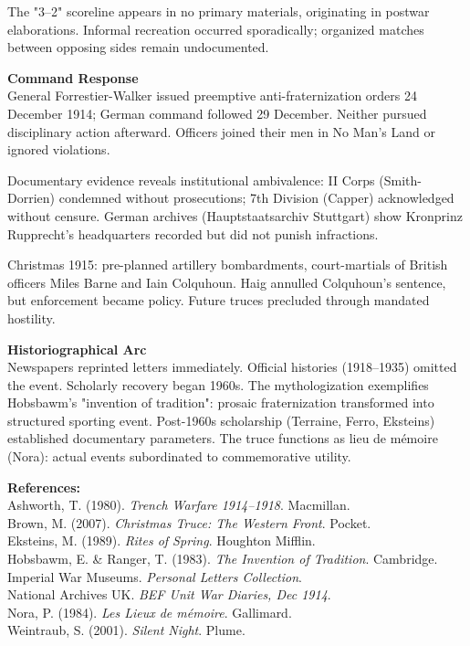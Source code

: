 \begin{technical}
The "3–2" scoreline appears in no primary materials, originating in postwar elaborations. Informal recreation occurred sporadically; organized matches between opposing sides remain undocumented.

\noindent\textbf{Command Response}\\[0.5em]
General Forrestier-Walker issued preemptive anti-fraternization orders 24 December 1914; German command followed 29 December. Neither pursued disciplinary action afterward. Officers joined their men in No Man's Land or ignored violations.

Documentary evidence reveals institutional ambivalence: II Corps (Smith-Dorrien) condemned without prosecutions; 7th Division (Capper) acknowledged without censure. German archives (Hauptstaatsarchiv Stuttgart) show Kronprinz Rupprecht's headquarters recorded but did not punish infractions.

Christmas 1915: pre-planned artillery bombardments, court-martials of British officers Miles Barne and Iain Colquhoun. Haig annulled Colquhoun's sentence, but enforcement became policy. Future truces precluded through mandated hostility.

\noindent\textbf{Historiographical Arc}\\[0.5em]
Newspapers reprinted letters immediately. Official histories (1918–1935) omitted the event. Scholarly recovery began 1960s. The mythologization exemplifies Hobsbawm's "invention of tradition": prosaic fraternization transformed into structured sporting event. Post-1960s scholarship (Terraine, Ferro, Eksteins) established documentary parameters. The truce functions as lieu de mémoire (Nora): actual events subordinated to commemorative utility.

\vspace{0.5em}
\noindent\textbf{References:}\\
Ashworth, T. (1980). \textit{Trench Warfare 1914–1918}. Macmillan.\\
Brown, M. (2007). \textit{Christmas Truce: The Western Front}. Pocket.\\
Eksteins, M. (1989). \textit{Rites of Spring}. Houghton Mifflin.\\
Hobsbawm, E. & Ranger, T. (1983). \textit{The Invention of Tradition}. Cambridge.\\
Imperial War Museums. \textit{Personal Letters Collection}.\\
National Archives UK. \textit{BEF Unit War Diaries, Dec 1914}.\\
Nora, P. (1984). \textit{Les Lieux de mémoire}. Gallimard.\\
Weintraub, S. (2001). \textit{Silent Night}. Plume.
\end{technical}
